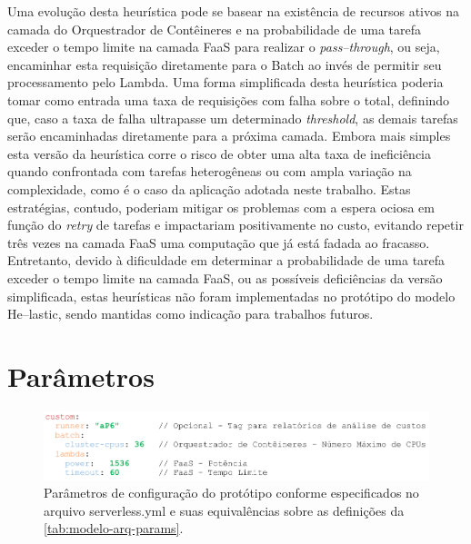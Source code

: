 \documentclass[english,brazilian]{UNISINOSmonografia} %
\begin{document}
Uma evolução desta heurística pode se basear na existência de recursos ativos na camada do Orquestrador de Contêineres e na probabilidade de uma tarefa exceder o tempo limite na camada FaaS para realizar o \textit{pass--through}, ou seja, encaminhar esta requisição diretamente para o Batch ao invés de permitir seu processamento pelo Lambda.
%
Uma forma simplificada desta heurística poderia tomar como entrada uma taxa de requisições com falha sobre o total, definindo que, caso a taxa de falha ultrapasse um determinado \textit{threshold}, as demais tarefas serão encaminhadas diretamente para a próxima camada.
%
Embora mais simples esta versão da heurística corre o risco de obter uma alta taxa de ineficiência quando confrontada com tarefas heterogêneas ou com ampla variação na complexidade, como é o caso da aplicação adotada neste trabalho.
%
Estas estratégias, contudo, poderiam mitigar os problemas com a espera ociosa em função do \textit{retry} de tarefas e impactariam positivamente no custo, evitando repetir três vezes na camada FaaS uma computação que já está fadada ao fracasso.
%
Entretanto, devido à dificuldade em determinar a probabilidade de uma tarefa exceder o tempo limite na camada FaaS, ou as possíveis deficiências da versão simplificada, estas heurísticas não foram implementadas no protótipo do modelo \textsf{He}--lastic, sendo mantidas como indicação para trabalhos futuros.




\section{Parâmetros}


\begin{figure}[bt]
	\centering%
	\begin{minipage}{\textwidth}
		\caption{Parâmetros de configuração do protótipo conforme especificados no arquivo serverless.yml e suas equivalências sobre as definições da \autoref{tab:modelo-arq-params}.}
		\label{fig:metodologia-parametros-yaml}
		\vspace{1ex}
		\includegraphics[width=\textwidth]{metodologia-parametros-yaml}
	\end{minipage}
\end{figure}
\end{document}
